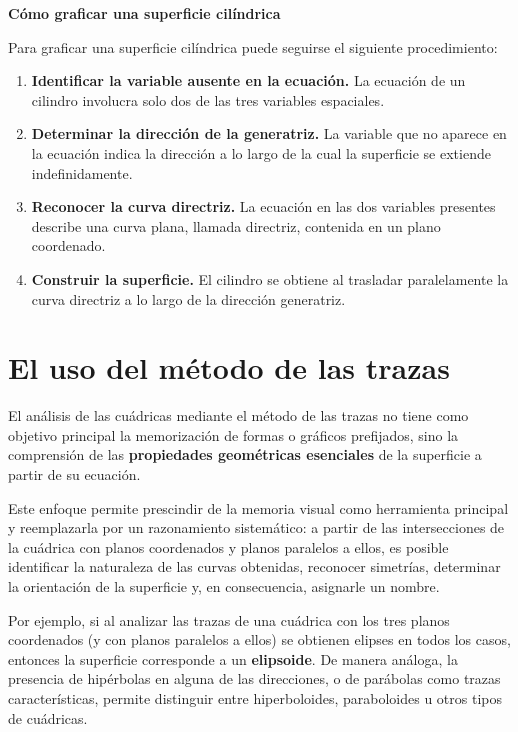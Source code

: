 \documentclass[11pt]{article}
\begin{document}
\begin{mdframed}[
    linewidth=0.8pt,
    roundcorner=6pt,
    backgroundcolor=gray!5
]
\textbf{Cómo graficar una superficie cilíndrica}

\medskip

Para graficar una superficie cilíndrica puede seguirse el siguiente procedimiento:

\begin{enumerate}
    \item \textbf{Identificar la variable ausente en la ecuación.}  
    La ecuación de un cilindro involucra solo dos de las tres variables espaciales.

    \item \textbf{Determinar la dirección de la generatriz.}  
    La variable que no aparece en la ecuación indica la dirección a lo largo de la cual la superficie se extiende indefinidamente.

    \item \textbf{Reconocer la curva directriz.}  
    La ecuación en las dos variables presentes describe una curva plana, llamada directriz, contenida en un plano coordenado.

    \item \textbf{Construir la superficie.}  
    El cilindro se obtiene al trasladar paralelamente la curva directriz a lo largo de la dirección generatriz.
\end{enumerate}
\end{mdframed}

\section*{El uso del método de las trazas}

El análisis de las cuádricas mediante el método de las trazas no tiene como objetivo principal la memorización de formas o gráficos prefijados, sino la comprensión de las \textbf{propiedades geométricas esenciales} de la superficie a partir de su ecuación.

Este enfoque permite prescindir de la memoria visual como herramienta principal y reemplazarla por un razonamiento sistemático: a partir de las intersecciones de la cuádrica con planos coordenados y planos paralelos a ellos, es posible identificar la naturaleza de las curvas obtenidas, reconocer simetrías, determinar la orientación de la superficie y, en consecuencia, asignarle un nombre.

Por ejemplo, si al analizar las trazas de una cuádrica con los tres planos coordenados (y con planos paralelos a ellos) se obtienen elipses en todos los casos, entonces la superficie corresponde a un \textbf{elipsoide}. De manera análoga, la presencia de hipérbolas en alguna de las direcciones, o de parábolas como trazas características, permite distinguir entre hiperboloides, paraboloides u otros tipos de cuádricas.
\end{document}
